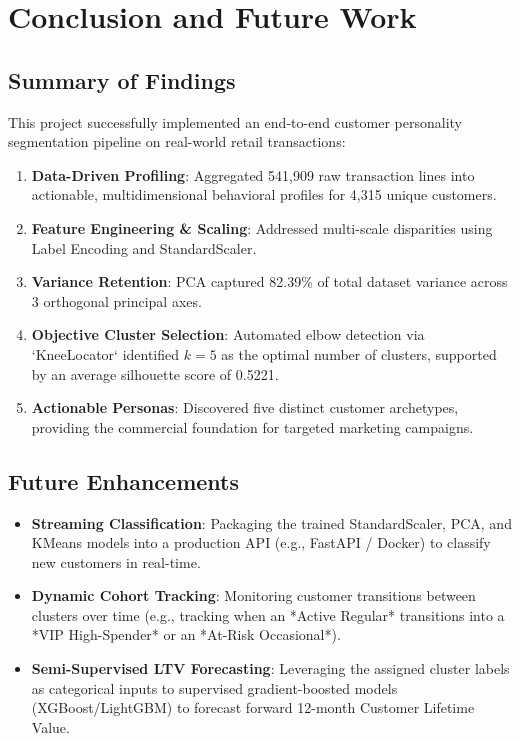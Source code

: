 \documentclass[11pt,a4paper]{article}
\begin{document}
\section{Conclusion and Future Work}

\subsection{Summary of Findings}
This project successfully implemented an end-to-end customer personality segmentation pipeline on real-world retail transactions:
\begin{enumerate}[leftmargin=*]
    \item \textbf{Data-Driven Profiling}: Aggregated 541,909 raw transaction lines into actionable, multidimensional behavioral profiles for 4,315 unique customers.
    \item \textbf{Feature Engineering \& Scaling}: Addressed multi-scale disparities using Label Encoding and StandardScaler.
    \item \textbf{Variance Retention}: PCA captured 82.39\% of total dataset variance across 3 orthogonal principal axes.
    \item \textbf{Objective Cluster Selection}: Automated elbow detection via `KneeLocator` identified $k=5$ as the optimal number of clusters, supported by an average silhouette score of 0.5221.
    \item \textbf{Actionable Personas}: Discovered five distinct customer archetypes, providing the commercial foundation for targeted marketing campaigns.
\end{enumerate}

\subsection{Future Enhancements}
\begin{itemize}[leftmargin=*]
    \item \textbf{Streaming Classification}: Packaging the trained StandardScaler, PCA, and KMeans models into a production API (e.g., FastAPI / Docker) to classify new customers in real-time.
    \item \textbf{Dynamic Cohort Tracking}: Monitoring customer transitions between clusters over time (e.g., tracking when an *Active Regular* transitions into a *VIP High-Spender* or an *At-Risk Occasional*).
    \item \textbf{Semi-Supervised LTV Forecasting}: Leveraging the assigned cluster labels as categorical inputs to supervised gradient-boosted models (XGBoost/LightGBM) to forecast forward 12-month Customer Lifetime Value.
\end{itemize}
\end{document}
